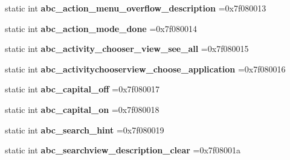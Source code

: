 \begin{DoxyCompactItemize}
\item 
\mbox{\label{classandroid_1_1support_1_1design_1_1R_1_1string_aefe67f33de30ee772eb4ed71fc0f42bf}} 
static int {\bfseries abc\+\_\+action\+\_\+menu\+\_\+overflow\+\_\+description} =0x7f080013
\item 
\mbox{\label{classandroid_1_1support_1_1design_1_1R_1_1string_a142595cc65636d6167d3769a08d2b006}} 
static int {\bfseries abc\+\_\+action\+\_\+mode\+\_\+done} =0x7f080014
\item 
\mbox{\label{classandroid_1_1support_1_1design_1_1R_1_1string_a8cdb3c76dd2a0be1f59e73e0ecf851d5}} 
static int {\bfseries abc\+\_\+activity\+\_\+chooser\+\_\+view\+\_\+see\+\_\+all} =0x7f080015
\item 
\mbox{\label{classandroid_1_1support_1_1design_1_1R_1_1string_a6b02edf838b7ec9e938b0b871b009f0c}} 
static int {\bfseries abc\+\_\+activitychooserview\+\_\+choose\+\_\+application} =0x7f080016
\item 
\mbox{\label{classandroid_1_1support_1_1design_1_1R_1_1string_a5f8146d94771bf0afb998adea20b6106}} 
static int {\bfseries abc\+\_\+capital\+\_\+off} =0x7f080017
\item 
\mbox{\label{classandroid_1_1support_1_1design_1_1R_1_1string_aec0edf1e522dc8bff81ef64bb29b9c6f}} 
static int {\bfseries abc\+\_\+capital\+\_\+on} =0x7f080018
\item 
\mbox{\label{classandroid_1_1support_1_1design_1_1R_1_1string_a34e13ed34ef7c389ec8711b6af99b626}} 
static int {\bfseries abc\+\_\+search\+\_\+hint} =0x7f080019
\item 
\mbox{\label{classandroid_1_1support_1_1design_1_1R_1_1string_af28f526cfe8599b4d2e07afa859d5acd}} 
static int {\bfseries abc\+\_\+searchview\+\_\+description\+\_\+clear} =0x7f08001a
\item 
\mbox{\label{classandroid_1_1support_1_1design_1_1R_1_1string_a4841964062debaef8184cbb99fe87f7e}} 

\end{DoxyCompactItemize}
